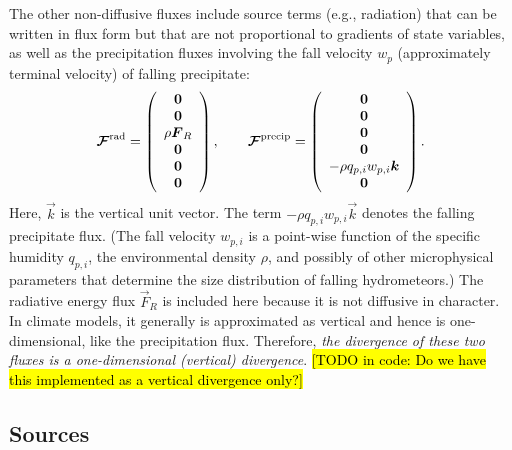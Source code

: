 \documentclass{report}
\begin{document}
{The other non-diffusive fluxes include source terms (e.g., radiation) that can be written in flux form but that are not proportional to gradients of state variables, as well as the precipitation fluxes involving the fall velocity $w_p$ (approximately terminal velocity) of falling precipitate:
\begin{equation}
\boldsymbol{{\mathcal{F}}}^{\mathrm{rad}} = 
\left( \begin{array}{c}
\boldsymbol{{0}} \\
\boldsymbol{{0}} \\
\rho \boldsymbol{{F}}_R \\
\boldsymbol{{0}} \\
\boldsymbol{{0}} \\
\boldsymbol{{0}} 
\end{array}
\right), \qquad
\boldsymbol{{\mathcal{F}}}^{\mathrm{precip}} = 
\left( \begin{array}{c}
\boldsymbol{{0}} \\
\boldsymbol{{0}} \\
\boldsymbol{{0}} \\
\boldsymbol{{0}} \\
-\rho q_{p,i} w_{p, i} \boldsymbol{{k}} \\
\boldsymbol{{0}} 
\end{array}
\right).
\label{eq:ndf_flux}
\end{equation}
Here, $\vec{k}$ is the vertical unit vector.  The term $-\rho q_{p,i} w_{p, i} \vec{k}$ denotes the falling precipitate flux. (The fall velocity $w_{p, i}$ is a point-wise function of the specific humidity $q_{p,i}$, the environmental density $\rho$, and possibly of other microphysical parameters that determine the size distribution of falling hydrometeors.) The radiative energy flux $\vec{F}_R$ is included here because it is not diffusive in character. In climate models, it generally is approximated as vertical and hence is one-dimensional, like the precipitation flux. Therefore, \emph{the divergence of these two fluxes is a one-dimensional (vertical) divergence}. \hl{[TODO in code: Do we have this implemented as a vertical divergence only?]}

\subsection{Sources}

}
\end{document}
